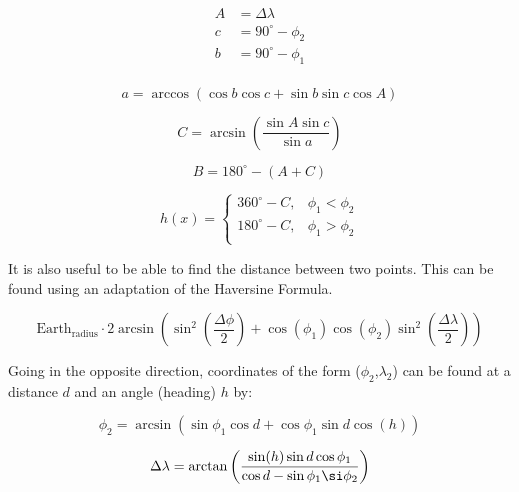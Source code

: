 \documentclass[12pt]{article}
\begin{document}
\begin{equation}
\begin{aligned}
A &=\Delta \lambda \\
c &=90^\circ - \phi_2 \\
b &=90^\circ - \phi_1 \\
\end{aligned}
\end{equation}

\begin{equation}
a = \arccos{(\cos{b}\cos{c} + \sin{b}\sin{c}\cos{A})}
\end{equation}

\begin{equation}
C =\arcsin{\left( \frac{\sin{A}\sin{c}}{\sin{a}} \right)}
\end{equation}

\begin{equation}
B = 180^\circ - (A + C)
\end{equation}

\begin{equation}
h(x) = \begin{cases}
  360^\circ - C, & \phi_1<\phi_2 \\
  180^\circ - C, & \phi_1>\phi_2 \\
\end{cases}
\end{equation}

It is also useful to be able to find the distance between two points.  This can be found using an adaptation of the Haversine Formula.

\begin{equation}
\text{Earth}_\text{radius}\cdot 2\arcsin\left(\sin^2{\left(\frac{\Delta \phi}{2}\right)} + \cos(\phi_1)\cos(\phi_2)\sin^2\left(\frac{\Delta \lambda}{2}\right)\right)
\end{equation}

Going in the opposite direction, coordinates of the form ($\phi_2$,$\lambda_2$) can be found at a distance $d$ and an angle (heading) $h$ by:


\begin{equation}
\label{great-circle-coords-lat}
\phi_2 = \arcsin(\sin\phi_1\cos d+\cos\phi_1\sin d\cos(h))
\end{equation}

\begin{equation}
\label{great-circle-coords-dlon}
\Delta\lambda = \arctan\left(\frac{\sin(h)\sin d\cos\phi_1}{\cos d-\sin\phi_1\si\phi_2}\right)
\end{equation}
\end{document}
